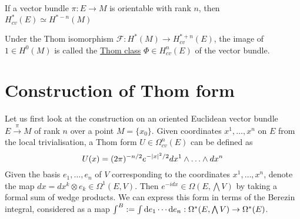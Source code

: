 \begin{thm} %
	If a vector bundle $\pi: E \to M$ is orientable with rank $n$, 
	then 
	 $H^*_{cv}(E) \simeq H^{*-n}(M)$
\end{thm}
\begin{defn}
	Under the Thom isomorphism $\mathcal{F}:H^*(M)\to H_{cv}^{*+n}(E)$, the
	image of $1\in H^0(M)$ is called the \underline{Thom class}  $\Phi\in
	H_{cv}^n(E)$ of the vector bundle.
\end{defn}



\section{Construction of Thom form}
Let us first look at the construction on an oriented Euclidean vector bundle
$E\xrightarrow{\pi} M$ of rank $n$ over a point $M=\{x_0\}$. 
Given coordinates $x^1,\ldots,x^n$ on $E$ from the local trivialisation,
a Thom form $U\in \Omega^n_{cv}(E)$ can be defined as
\[
	U(x) = (2\pi)^{-n/2}e^{-\abs{x}^2 /2} dx^1\wedge \ldots\wedge dx^n
\] 
Given the basis $e_1,\ldots,e_n$ of  $V$ corresponding to the coordinates
$x^1,\ldots,x^n$, denote the map $dx = dx^k \otimes e_k \in 
\Omega^1(E, V)$. Then $e^{-idx}\in \Omega(E,\bigwedge V)$ by taking a formal sum
of wedge products.
We can express this form in terms of the Berezin integral,
considered as a map $\int^B := \int \odif{e_1}\cdots\odif{e_n} 
: \Omega^*(E,\bigwedge V) \to \Omega^*(E)$.

